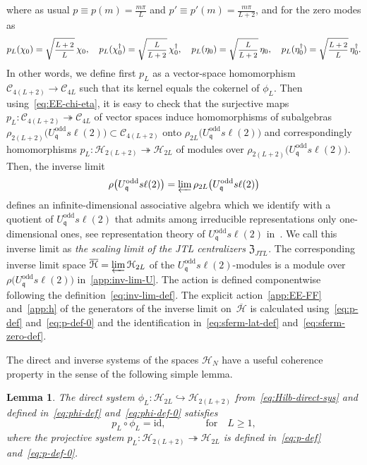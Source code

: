 \documentclass[11pt]{article}
\newcommand{\surj}{\twoheadrightarrow}
\newcommand{\inj}{\hookrightarrow}
\newcommand{\q}{\mathfrak{q}}
\newcommand{\ffrac}[2]{\mbox{\footnotesize$\displaystyle\frac{#1}{#2}$}}
\newcommand{\JTL}[1]{JTL_{#1}}
\newcommand{\LQGodd}{U^{\text{odd}}_{\q} s\ell(2)}
\newcommand{\Hilb}{\mathcal{H}}
\newcommand{\cHilb}{\overline{\Hilb}}
\newcommand{\interLie}{\mathfrak{S}}
\newcommand{\Clif}[1]{\mathscr{C}_{#1}}
\newcommand{\interinfin}{\interLie_{\infty}}
\newcommand{\cent}{\mathfrak{Z}}
\newcommand{\centJTL}{\cent_{\JTL{}}}
\newtheorem{Lemma}[subsection]{Lemma}
\theoremstyle{definition}
\begin{document}
where as usual
$p\equiv p(m)=\frac{m\pi}{L}$ and $p'\equiv p'(m)=\frac{m\pi}{L+2}$,
and for the zero modes as
 \begin{equation}\label{eq:p-def-0}
p_L(\chi_0)=\sqrt{\ffrac{L+2}{L}}\,\chi_0, \quad
p_L(\chi^{\dagger}_0)=\sqrt{\ffrac{L}{L+2}}\,\chi^{\dagger}_0,\quad
p_L(\eta_0)=\sqrt{\ffrac{L}{L+2}}\,\eta_0, \quad
p_L(\eta^{\dagger}_0)=\sqrt{\ffrac{L+2}{L}}\,\eta^{\dagger}_0.
 \end{equation}
In other words, we define first $p_L$ as a vector-space homomorphism $\Clif{4(L+2)}\to\Clif{4L}$ such that its kernel equals the cokernel of $\phi_L$.
Then using~\eqref{eq:EE-chi-eta}, it is easy to check that the surjective maps $p_L:\Clif{4(L+2)}\surj\Clif{4L}$ of vector spaces  induce homomorphisms of subalgebras $\rho_{2(L+2)}\bigl(\LQGodd\bigr)\subset\Clif{4(L+2)}$ onto $\rho_{2L}\bigl(\LQGodd\bigr)$ and correspondingly homomorphisms $p_L:\Hilb_{2(L+2)}\surj\Hilb_{2L}$ of modules over $\rho_{2(L+2)}\bigl(\LQGodd\bigr)$.
Then, the inverse limit
\begin{equation}\label{app:inv-lim-U}
\rho\bigl(\LQGodd\bigr)=\varprojlim \rho_{2L}\bigl(\LQGodd\bigr)
 \end{equation}
defines an infinite-dimensional associative algebra  which we identify with a quotient of $\LQGodd$ that admits among irreducible representations only one-dimensional ones, see representation theory of $\LQGodd$ in~\cite[Sec.~3]{GRS2}. We call this inverse limit as \textit{the scaling limit of the JTL centralizers} $\centJTL$. The corresponding inverse limit space $\cHilb=\varprojlim \Hilb_{2L}$ of the $\LQGodd$-modules is a module over $\rho\bigl(\LQGodd\bigr)$ in~\eqref{app:inv-lim-U}. The action is defined componentwise following the definition~\eqref{eq:inv-lim-def}. The explicit  action~\eqref{app:EE-FF} and~\eqref{app:h} of the generators of the inverse limit on~$\cHilb$ is calculated  using~\eqref{eq:p-def} and~\eqref{eq:p-def-0} and the identification in~\eqref{eq:sferm-lat-def} and~\eqref{eq:sferm-zero-def}.


The direct and inverse systems of the spaces $\Hilb_{N}$ have a useful coherence property in the sense of the following simple lemma.

\begin{Lemma}\label{lem:coh}
The direct system $\phi_L:\Hilb_{2L}\inj\Hilb_{2(L+2)}$ from~\eqref{eq:Hilb-direct-sys} and defined in~\eqref{eq:phi-def} and~\eqref{eq:phi-def-0}
satisfies
\begin{equation}\label{eq:coherence}
p_L\circ\phi_L = \mathrm{id},\qquad\qquad \text{for}\quad L\geq1,
\end{equation}
where the projective system $p_L:\Hilb_{2(L+2)}\surj\Hilb_{2L}$ is defined in~\eqref{eq:p-def} and~\eqref{eq:p-def-0}.
\end{Lemma}
\end{document}
